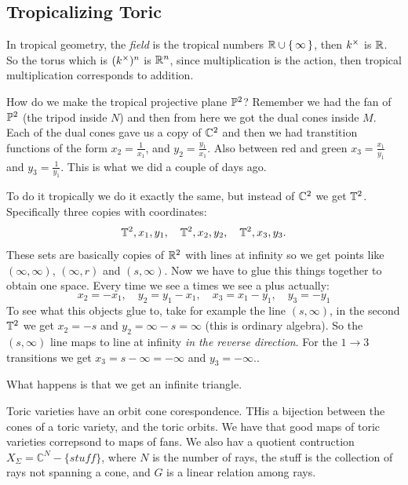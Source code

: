 \documentclass[12pt]{memoir}
\theoremstyle{definition}
\def\CC{{\mathbb C}}
\begin{document}
\subsection{Tropicalizing Toric}

In tropical geometry, the \emph{field} is the tropical numbers $\mathbb{R}\cup\{\,\infty\,\}$, then $k^\times$ is $\mathbb{R}$. So the torus which is $(k^\times)^n$ is $\mathbb{R}^n$, since multiplication is the action, then tropical multiplication corresponds to addition. 

\begin{Ex}
    How do we make the tropical projective plane $\mathbb{P}^2$? Remember we had the fan of $\mathbb{P}^2$ (the tripod inside $N$) and then from here we got the dual cones inside $M$. Each of the dual cones gave us a copy of $\mathbb{C}^2$ and then we had transtition functions of the form $x_2=\frac{1}{x_1}$, and $y_2=\frac{y_1}{x_1}$. Also between red and green $x_3=\frac{x_1}{y_1}$ and $y_3=\frac{1}{y_1}$. This is what we did a couple of days ago.\par 
    To do it tropically we do it exactly the same, but instead of $\mathbb{C}^2$ we get $\mathbb{T}^2$. Specifically three copies with coordinates:
    $$\mathbb{T}^2,x_1,y_1,\quad\mathbb{T}^2,x_2,y_2,\quad\mathbb{T}^2,x_3,y_3.$$ 
    These sets are basically copies of $\mathbb{R}^2$ with lines at infinity so we get points like $(\infty,\infty)$, $(\infty,r)$ and $(s,\infty)$. Now we have to glue this things together to obtain one space. Every time we see a times we see a plus actually:
    $$x_2=-x_1,\quad y_2=y_1-x_1,\quad x_3=x_1-y_1,\quad y_3=-y_1$$
    To see what this objects glue to, take for example the line $(s,\infty)$, in the second $\mathbb{T}^2$ we get $x_2=-s$ and $y_2=\infty-s=\infty$ (this is ordinary algebra). So the $(s,\infty)$ line maps to line at infinity \emph{in the reverse direction}. For the $1\to3$ transitions we get $x_3=s-\infty=-\infty$ and $y_3=-\infty$..\par 
    What happens is that we get an infinite triangle.
\end{Ex}




Toric varieties have an orbit cone corespondence. THis a bijection between the cones of a toric variety, and the toric orbits.  We have that good maps of toric varieties correpsond to maps of fans. We also hav a quotient contruction $X_\Sigma = \CC^N - \{stuff\}$, where $N$ is the number of rays, the stuff is the collection of rays not spanning a cone, and $G$ is a linear relation among rays.
\end{document}
